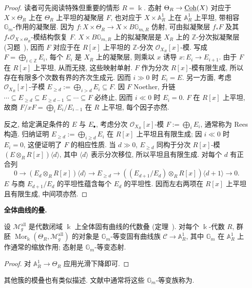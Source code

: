 \begin{proof}
读者可先阅读特殊但重要的情形 $R=\Bbbk$. 态射 $\Theta_R\to\underline{\mathrm{Coh}}(X)$ 对应于 $X\times\Theta_R$ 上在 $\Theta_R$ 上平坦的凝聚层 $F$, 也对应于 $X\times\mathbb A_R^1$ 上在 $\mathbb A_R^1$ 上平坦, 带相容 $\mathbb G_m$-作用的凝聚层. 因为 $f:X\times\Theta_R\to X\times B\mathbb G_{m,R}$ 仿射, 可由拟凝聚层 $f_*F$ 及其 $f_*\mathcal O_{X\times\Theta_R}$-模结构恢复 $F$. $X\times B\mathbb G_{m,R}$ 上的拟凝聚层是 $X_R$ 上的 $\mathbb Z$-分次拟凝聚层 (习题~), 因而 $F$ 对应于在 $R[x]$ 上平坦的 $\mathbb Z$-分次 $\mathcal O_{X_R}[x]$-模. 写成 $F=\bigoplus_{i\in\mathbb Z}E_i$, 每个 $E_i$ 是 $X_R$ 上的凝聚层, 则乘以 $x$ 诱导 $x:E_i\to E_{i+1}$. 由于 $F$ 在 $R[x]$ 上平坦, 从而无挠, 这些映射单射. $F$ 作为分次 $R[x]$-模有限生成, 所以存在有限多个次数有界的齐次生成元. 因而 $i\gg0$ 时 $E_i=E$. 另一方面, 考虑 $\mathcal O_{X_R}[x]$-子模 $E_{\geq d}:=\bigoplus_{i>d}E_i\subseteq F$. 因 $F$ Noether, 升链 $\cdots\subseteq E_{\geq d}\subseteq E_{\geq d-1}\subseteq\cdots\subseteq F$ 必终止, 因而 $i\ll0$ 时 $E_i=0$. $F$ 在 $R[x]$ 上平坦, 故商 $F/xF=\bigoplus_iE_i/E_{i-1}$ 在 $R$ 上平坦, 每个因子亦然.

反之, 给定满足条件的 $E$ 与 $E_\bullet$, 考虑分次 $\mathcal O_{X_R}[x]$-模 $F:=\bigoplus_iE_i$, 通常称为 Rees 构造. 归纳证明 $E_{\geq d}:=\bigoplus_{i\geq d}E_i$ 在 $R[x]$ 上平坦且有限生成; 因 $i\ll0$ 时 $E_i=0$, 这便证明了 $F$ 的相应性质. 当 $d\gg0$, $E_{\geq d}$ 同构于分次 $R[x]$-模 $(E\otimes_RR[x])\langle d\rangle$, 其中 $\langle d\rangle$ 表示分次移位, 所以平坦且有限生成. 对每个 $d$ 有正合列
\[0\to(E_d\otimes_RR[x])\langle d\rangle\to E_{\geq d}\to((E_{d+1}/E_d)\otimes_RR[x])\langle d+1\rangle\to0.\]
$E$ 与商 $E_{d+1}/E_d$ 的平坦性蕴含每个 $E_d$ 的平坦性. 因而左右两项在 $R[x]$ 上平坦且有限生成, 中间项亦然.
\end{proof}
\textbf{全体曲线的叠.}
\begin{proposition}\label{src:7.9.7}
设 $\mathcal M_g^{\mathrm{all}}$ 是代数闭域 $\Bbbk$ 上全体固有曲线的代数叠 (定理~). 对每个 $\Bbbk$-代数 $R$, 群胚 $\operatorname{Mor}_{\Bbbk}(\Theta_R,\mathcal M_g^{\mathrm{all}})$ 的对象是 $\mathbb G_m$-等变固有曲线族 $\mathcal C\to\mathbb A_R^1$, 其中 $\mathbb G_m$ 在 $\mathbb A_R^1$ 上作通常的缩放作用; 态射是 $\mathbb G_m$-等变态射.
\end{proposition}
\begin{proof}
对 $\mathbb A_R^1\to\Theta_R$ 应用光滑下降即可.
\end{proof}
\begin{remark}\label{src:7.9.8}
其他簇的模叠也有类似描述. 文献中通常将这些 $\mathbb G_m$-等变族称为.
\end{remark}
